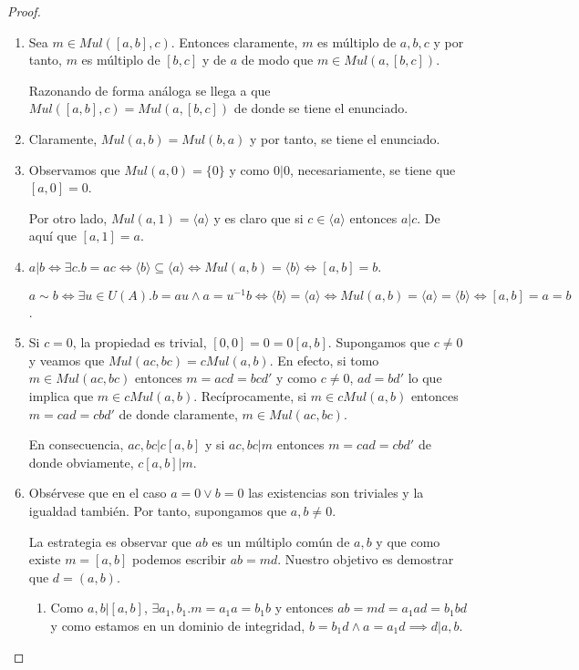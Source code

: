 \begin{proof}
\begin{enumerate}
\item Sea $m \in Mul([a,b],c)$.  Entonces claramente, $m$ es múltiplo de $a,b,c$ y por tanto, $m$ es múltiplo de $[b,c]$ y de $a$ de modo que $m \in Mul(a,[b,c])$. 

Razonando de forma análoga se llega a que $Mul([a,b],c) = Mul(a,[b,c])$ de donde se tiene el enunciado.  

\item Claramente, $Mul(a,b) = Mul(b,a)$ y por tanto, se tiene el enunciado. 

\item Observamos que $Mul(a,0) = \{0\}$ y como $0|0$, necesariamente, se tiene que $[a,0] = 0$. 

Por otro lado, $Mul(a,1) = \langle a \rangle$ y es claro que si $c \in \langle a \rangle$ entonces $a|c$. De aquí que $[a,1] = a$. 

\item $a|b \iff \exists c.b = ac \iff \langle b \rangle \subseteq \langle a \rangle \iff Mul(a,b) = \langle b \rangle \iff [a,b] = b$. 

$a \sim b \iff \exists u \in U(A).b = au \land a = u^{-1}b \iff \langle b \rangle = \langle a \rangle \iff Mul(a,b) = \langle a \rangle = \langle b \rangle \iff [a,b] = a = b$.

\item Si $c = 0$, la propiedad es trivial, $[0,0] = 0 = 0 [a,b]$. Supongamos que $c \neq 0$ y veamos que $Mul(ac,bc) = cMul(a,b)$. En efecto, si tomo $m \in Mul(ac,bc)$ entonces $m = acd = bcd'$ y como $c \neq 0$, $ad = bd'$ lo que implica que $m \in cMul(a,b)$. Recíprocamente, si $m \in cMul(a,b)$ entonces $m = cad = cbd'$ de donde claramente, $m \in Mul(ac,bc)$. 

En consecuencia, $ac,bc|c[a,b]$ y si $ac,bc|m$ entonces $m = cad = cbd'$ de donde obviamente, $c[a,b]|m$. 

\item Obsérvese que en el caso $a = 0 \lor b = 0$ las existencias son triviales y la igualdad también. Por tanto, supongamos que $a,b \neq 0$. 

La estrategia es observar que $ab$ es un múltiplo común de $a,b$ y que como existe $m = [a,b]$ podemos escribir $ab = md$. Nuestro objetivo es demostrar que $d = (a,b)$. 

\begin{enumerate}
\item Como $a,b|[a,b]$, $\exists a_1,b_1.m = a_1a = b_1b$ y entonces $ab = md = a_1ad = b_1bd$ y como estamos en un dominio de integridad, $b = b_1d \land a = a_1d \implies d|a,b$. 


\end{enumerate}
\end{enumerate}
\end{proof}
